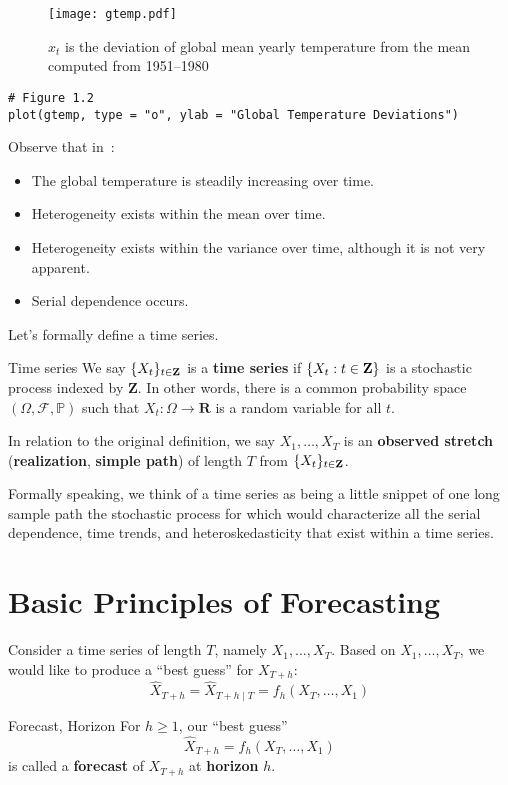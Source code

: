 \begin{figure}[!ht]
    \centering
    \texttt{[image: gtemp.pdf]}
    \caption{$ x_t $ is the deviation of global mean
        yearly temperature from the mean computed from 1951--1980}\label{fig:gtemp}
\end{figure}
\begin{verbatim}
# Figure 1.2
plot(gtemp, type = "o", ylab = "Global Temperature Deviations")
\end{verbatim}
Observe that in~:
\begin{itemize}
    \item The global temperature is steadily increasing over time.
    \item Heterogeneity exists within the mean over time.
    \item Heterogeneity exists within the variance over time, although it is not very apparent.
    \item Serial dependence occurs.
\end{itemize}
Let's formally define a time series.
\begin{Definition}{Time series}{}
    We say $ \{X_t\}_{t\in\mathbf{Z}} $
    is a \textbf{time series} if $ \{X_t : t\in\mathbf{Z}\} $
    is a stochastic process indexed by $ \mathbf{Z} $.
    In other words, there is a common probability space
    $ (\Omega,\mathcal{F},\mathbb{P}) $ such that
    $ X_t:\Omega\to\mathbf{R} $ is a random variable
    for all $ t $.

    In relation to the original definition, we say
    $ X_1,\ldots,X_T $ is an \textbf{observed stretch} (\textbf{realization},
    \textbf{simple path}) of length $ T $ from $ \{X_t\}_{t\in\mathbf{Z}} $.
\end{Definition}
{\color{blue}Formally speaking, we think of a time series as being a little snippet
of one long sample path the stochastic process for which would characterize
all the serial dependence, time trends, and heteroskedasticity
that exist within a time series.}

\section{Basic Principles of Forecasting}
Consider a time series of length $ T $, namely $ X_1,\ldots,X_T $.
Based on $ X_1,\ldots,X_T $, we would like to produce a ``best guess''
for $ X_{T+h} $:
\[ \hat{X}_{T+h}=\hat{X}_{T+h\mid T}=f_h(X_T,\ldots,X_1) \]
\begin{Definition}{Forecast, Horizon}{}
    For $ h\ge 1 $, our ``best guess''
    \[ \hat{X}_{T+h}=f_h(X_T,\ldots,X_1) \]
    is called a \textbf{forecast} of $ X_{T+h} $
    at \textbf{horizon} $ h $.
\end{Definition}

